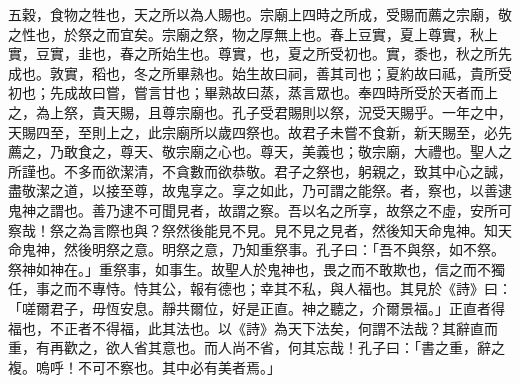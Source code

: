 五穀，食物之牲也，天之所以為人賜也。宗廟上四時之所成，受賜而薦之宗廟，敬之性也，於祭之而宜矣。宗廟之祭，物之厚無上也。春上豆實，夏上尊實，秋上實，豆實，韭也，春之所始生也。尊實，也，夏之所受初也。實，黍也，秋之所先成也。敦實，稻也，冬之所畢熟也。始生故曰祠，善其司也；夏約故曰祗，貴所受初也；先成故曰嘗，嘗言甘也；畢熟故曰蒸，蒸言眾也。奉四時所受於天者而上之，為上祭，貴天賜，且尊宗廟也。孔子受君賜則以祭，況受天賜乎。一年之中，天賜四至，至則上之，此宗廟所以歲四祭也。故君子未嘗不食新，新天賜至，必先薦之，乃敢食之，尊天、敬宗廟之心也。尊天，美義也；敬宗廟，大禮也。聖人之所謹也。不多而欲潔清，不貪數而欲恭敬。君子之祭也，躬親之，致其中心之誠，盡敬潔之道，以接至尊，故鬼享之。享之如此，乃可謂之能祭。者，察也，以善逮鬼神之謂也。善乃逮不可聞見者，故謂之察。吾以名之所享，故祭之不虛，安所可察哉！祭之為言際也與？祭然後能見不見。見不見之見者，然後知天命鬼神。知天命鬼神，然後明祭之意。明祭之意，乃知重祭事。孔子曰：「吾不與祭，如不祭。祭神如神在。」重祭事，如事生。故聖人於鬼神也，畏之而不敢欺也，信之而不獨任，事之而不專恃。恃其公，報有德也；幸其不私，與人福也。其見於《詩》曰：「嗟爾君子，毋恆安息。靜共爾位，好是正直。神之聽之，介爾景福。」正直者得福也，不正者不得福，此其法也。以《詩》為天下法矣，何謂不法哉？其辭直而重，有再歡之，欲人省其意也。而人尚不省，何其忘哉！孔子曰：「書之重，辭之複。嗚呼！不可不察也。其中必有美者焉。」


